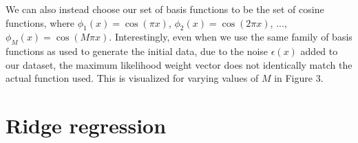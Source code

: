 \documentclass{article}
\begin{document}
We can also instead choose our set of basis functions to be the set of cosine functions, where $\phi_1(x) = \cos(\pi x)$, $\phi_2(x) = \cos(2 \pi x)$, ..., $\phi_M(x) = \cos(M \pi x)$. Interestingly, even when we use the same family of basis functions as used to generate the initial data, due to the noise $\epsilon(x)$ added to our dataset, the maximum likelihood weight vector does not identically match the actual function used. This is visualized for varying values of $M$ in Figure 3.

\section{Ridge regression}
\end{document}
